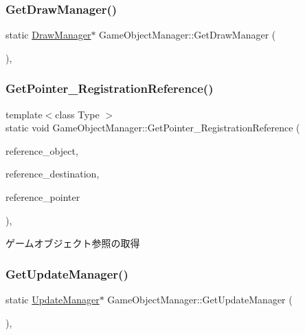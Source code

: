 \subsubsection{\texorpdfstring{Get\+Draw\+Manager()}{GetDrawManager()}}
{\footnotesize\ttfamily static \mbox{\hyperlink{class_draw_manager}{Draw\+Manager}}$\ast$ Game\+Object\+Manager\+::\+Get\+Draw\+Manager (\begin{DoxyParamCaption}{ }\end{DoxyParamCaption})\hspace{0.3cm}{\ttfamily [inline]}, {\ttfamily [static]}}

\mbox{\label{class_game_object_manager_a4b905d160c31b234686a3d46c0743adb}} 
\subsubsection{\texorpdfstring{Get\+Pointer\+\_\+\+Registration\+Reference()}{GetPointer\_RegistrationReference()}}
{\footnotesize\ttfamily template$<$class Type $>$ \\
static void Game\+Object\+Manager\+::\+Get\+Pointer\+\_\+\+Registration\+Reference (\begin{DoxyParamCaption}\item[{\mbox{\hyperlink{class_game_object_base}{Game\+Object\+Base}} $\ast$}]{reference\+\_\+object,  }\item[{Type $\ast$}]{reference\+\_\+destination,  }\item[{Type $\ast$}]{reference\+\_\+pointer }\end{DoxyParamCaption})\hspace{0.3cm}{\ttfamily [inline]}, {\ttfamily [static]}}



ゲームオブジェクト参照の取得 

\mbox{\label{class_game_object_manager_a7d34b53f99cc2264ab6a8c253392a865}} 
\subsubsection{\texorpdfstring{Get\+Update\+Manager()}{GetUpdateManager()}}
{\footnotesize\ttfamily static \mbox{\hyperlink{class_update_manager}{Update\+Manager}}$\ast$ Game\+Object\+Manager\+::\+Get\+Update\+Manager (\begin{DoxyParamCaption}{ }\end{DoxyParamCaption})\hspace{0.3cm}{\ttfamily [inline]}, {\ttfamily [static]}}

